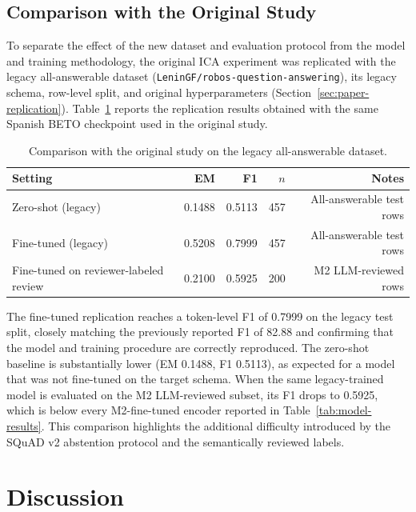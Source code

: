 \documentclass[graybox]{SNmult}
\begin{document}
\subsection{Comparison with the Original Study}

To separate the effect of the new dataset and evaluation protocol from the
model and training methodology, the original ICA experiment was replicated
with the legacy all-answerable dataset
(\texttt{LeninGF/robos-question-answering}), its legacy schema, row-level
split, and original hyperparameters (Section~\ref{sec:paper-replication}).
Table~\ref{tab:paper-replication} reports the replication results obtained
with the same Spanish BETO checkpoint used in the original study.

\begin{table}[!t]
\caption{Comparison with the original study on the legacy all-answerable dataset.}
\label{tab:paper-replication}
\centering
\small
\begin{tabular}{lrrrr}
\toprule
Setting & EM & F1 & $n$ & Notes \\
\midrule
Zero-shot (legacy) & 0.1488 & 0.5113 & 457 & All-answerable test rows \\
Fine-tuned (legacy) & 0.5208 & 0.7999 & 457 & All-answerable test rows \\
Fine-tuned on reviewer-labeled review & 0.2100 & 0.5925 & 200 & M2 LLM-reviewed rows \\
\bottomrule
\end{tabular}
\end{table}

The fine-tuned replication reaches a token-level F1 of 0.7999 on the legacy
test split, closely matching the previously reported F1 of 82.88 and
confirming that the model and training procedure are correctly reproduced. The
zero-shot baseline is substantially lower (EM 0.1488, F1 0.5113), as expected
for a model that was not fine-tuned on the target schema. When the same
legacy-trained model is evaluated on the M2 LLM-reviewed subset, its F1
drops to 0.5925, which is below every M2-fine-tuned encoder reported in
Table~\ref{tab:model-results}. This comparison highlights the additional
difficulty introduced by the SQuAD v2 abstention protocol and the semantically
reviewed labels.

\section{Discussion}
\label{sec:discussion}
\end{document}
